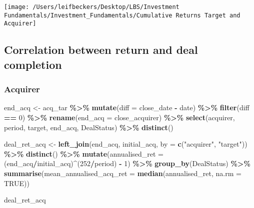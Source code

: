 \documentclass[
]{article}
\newenvironment{Shaded}{\begin{snugshade}}{\end{snugshade}}
\newcommand{\DataTypeTok}[1]{\textcolor[rgb]{0.13,0.29,0.53}{#1}}
\newcommand{\DecValTok}[1]{\textcolor[rgb]{0.00,0.00,0.81}{#1}}
\newcommand{\KeywordTok}[1]{\textcolor[rgb]{0.13,0.29,0.53}{\textbf{#1}}}
\newcommand{\NormalTok}[1]{#1}
\newcommand{\OperatorTok}[1]{\textcolor[rgb]{0.81,0.36,0.00}{\textbf{#1}}}
\newcommand{\OtherTok}[1]{\textcolor[rgb]{0.56,0.35,0.01}{#1}}
\newcommand{\StringTok}[1]{\textcolor[rgb]{0.31,0.60,0.02}{#1}}
\begin{document}
\begin{center}\texttt{[image: /Users/leifbeckers/Desktop/LBS/Investment Fundamentals/Investment\_Fundamentals/Cumulative Returns Target and Acquirer]} \end{center}

\hypertarget{correlation-between-return-and-deal-completion}{%
\subsection{Correlation between return and deal
completion}\label{correlation-between-return-and-deal-completion}}

\hypertarget{acquirer-1}{%
\subsubsection{Acquirer}\label{acquirer-1}}

\begin{Shaded}
\begin{Highlighting}[]
\NormalTok{end\_acq \textless{}{-}}\StringTok{ }\NormalTok{acq\_tar }\OperatorTok{\%\textgreater{}\%}
\StringTok{  }\KeywordTok{mutate}\NormalTok{(}\DataTypeTok{diff =}\NormalTok{ close\_date }\OperatorTok{{-}}\StringTok{ }\NormalTok{date) }\OperatorTok{\%\textgreater{}\%}
\StringTok{  }\KeywordTok{filter}\NormalTok{(diff }\OperatorTok{==}\StringTok{ }\DecValTok{0}\NormalTok{) }\OperatorTok{\%\textgreater{}\%}
\StringTok{  }\KeywordTok{rename}\NormalTok{(}\DataTypeTok{end\_acq =}\NormalTok{ close\_acquirer) }\OperatorTok{\%\textgreater{}\%}
\StringTok{  }\KeywordTok{select}\NormalTok{(acquirer, period, target, end\_acq, DealStatus) }\OperatorTok{\%\textgreater{}\%}
\StringTok{  }\KeywordTok{distinct}\NormalTok{()}


\NormalTok{deal\_ret\_acq \textless{}{-}}\StringTok{ }\KeywordTok{left\_join}\NormalTok{(end\_acq, initial\_acq, }\DataTypeTok{by =} \KeywordTok{c}\NormalTok{(}\StringTok{"acquirer"}\NormalTok{, }\StringTok{"target"}\NormalTok{)) }\OperatorTok{\%\textgreater{}\%}\StringTok{ }
\StringTok{  }\KeywordTok{distinct}\NormalTok{() }\OperatorTok{\%\textgreater{}\%}
\StringTok{  }\KeywordTok{mutate}\NormalTok{(}\DataTypeTok{annualised\_ret =}\NormalTok{ (end\_acq}\OperatorTok{/}\NormalTok{initial\_acq)}\OperatorTok{\^{}}\NormalTok{(}\DecValTok{252}\OperatorTok{/}\NormalTok{period) }\OperatorTok{{-}}\StringTok{ }\DecValTok{1}\NormalTok{) }\OperatorTok{\%\textgreater{}\%}
\StringTok{  }\KeywordTok{group\_by}\NormalTok{(DealStatus) }\OperatorTok{\%\textgreater{}\%}
\StringTok{  }\KeywordTok{summarise}\NormalTok{(}\DataTypeTok{mean\_annualised\_acq\_ret =} \KeywordTok{median}\NormalTok{(annualised\_ret, }\DataTypeTok{na.rm =} \OtherTok{TRUE}\NormalTok{))}

\NormalTok{deal\_ret\_acq}
\end{Highlighting}
\end{Shaded}
\end{document}

